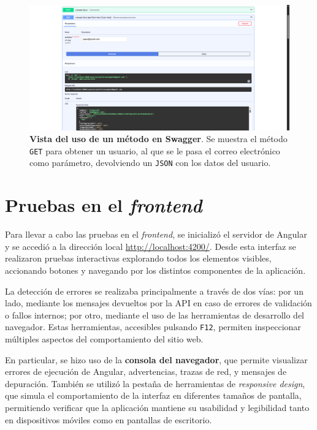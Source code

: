 \begin{figure}[H]
	\centering
	\includegraphics[width=1\linewidth]{imagenes/swagger2.png}
	\caption[\textbf{Vista del uso de un método en Swagger}.]{\textbf{Vista del uso de un método en Swagger}. Se muestra el método \texttt{GET} para obtener un usuario, al que se le pasa el correo electrónico como parámetro, devolviendo un \texttt{JSON} con los datos del usuario.}
	\label{swagger-2}
\end{figure}


\section{Pruebas en el \textit{frontend}}

Para llevar a cabo las pruebas en el \textit{frontend}, se inicializó el servidor de Angular y se accedió a la dirección local \href{http://localhost:4200/}{http://localhost:4200/}. Desde esta interfaz se realizaron pruebas interactivas explorando todos los elementos visibles, accionando botones y navegando por los distintos componentes de la aplicación.

La detección de errores se realizaba principalmente a través de dos vías: por un lado, mediante los mensajes devueltos por la API en caso de errores de validación o fallos internos; por otro, mediante el uso de las herramientas de desarrollo del navegador. Estas herramientas, accesibles pulsando \texttt{F12}, permiten inspeccionar múltiples aspectos del comportamiento del sitio web.

En particular, se hizo uso de la \textbf{consola del navegador}, que permite visualizar errores de ejecución de Angular, advertencias, trazas de red, y mensajes de depuración. También se utilizó la pestaña de herramientas de \textit{responsive design}, que simula el comportamiento de la interfaz en diferentes tamaños de pantalla, permitiendo verificar que la aplicación mantiene su usabilidad y legibilidad tanto en dispositivos móviles como en pantallas de escritorio.

